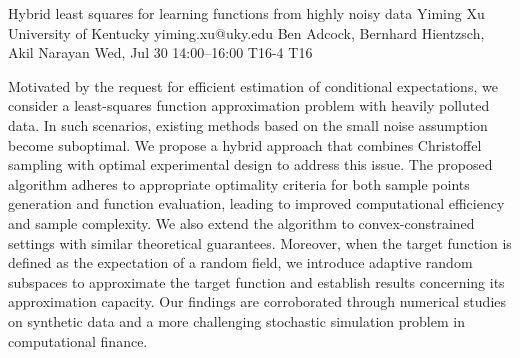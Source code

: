 \begin{talk}
  {Hybrid least squares for learning functions from highly noisy data}%
  {Yiming Xu}%
  {University of Kentucky}%
  {yiming.xu@uky.edu}%
  {Ben Adcock, Bernhard Hientzsch, Akil Narayan}%
  {}%
  {Wed, Jul 30 14:00–16:00}%
  {T16-4}%
  {T16}%
  
				
			
Motivated by the request for efficient estimation of conditional expectations, we consider a least-squares function approximation problem with heavily polluted data. In such scenarios, existing methods based on the small noise assumption become suboptimal. We propose a hybrid approach that combines Christoffel sampling with optimal experimental design to address this issue. The proposed algorithm adheres to appropriate optimality criteria for both sample points generation and function evaluation, leading to improved computational efficiency and sample complexity. We also extend the algorithm to convex-constrained settings with similar theoretical guarantees. Moreover, when the target function is defined as the expectation of a random field, we introduce adaptive random subspaces to approximate the target function and establish results concerning its approximation capacity. Our findings are corroborated through numerical studies on synthetic data and a more challenging stochastic simulation problem in computational finance.
\medskip

\end{talk}
